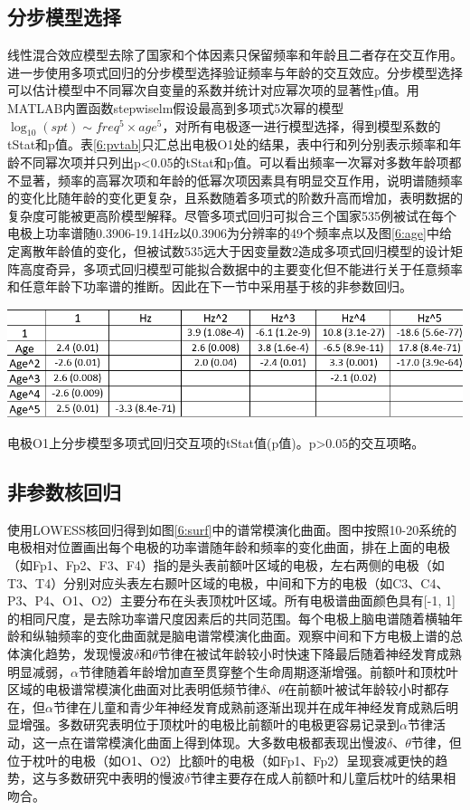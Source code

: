 \subsection{分步模型选择}
线性混合效应模型去除了国家和个体因素只保留频率和年龄且二者存在交互作用。进一步使用多项式回归的分步模型选择验证频率与年龄的交互效应。分步模型选择可以估计模型中不同幂次自变量的系数并统计对应幂次项的显著性p值。用MATLAB内置函数stepwiselm假设最高到多项式5次幂的模型$\log_{10}(spt)\sim{freq^5\times{age^5}}$，对所有电极逐一进行模型选择，得到模型系数的tStat和p值。表\ref{6:pvtab}只汇总出电极O1处的结果，表中行和列分别表示频率和年龄不同幂次项并只列出p<0.05的tStat和p值。可以看出频率一次幂对多数年龄项都不显著，频率的高幂次项和年龄的低幂次项因素具有明显交互作用，说明谱随频率的变化比随年龄的变化更复杂，且系数随着多项式的阶数升高而增加，表明数据的复杂度可能被更高阶模型解释。尽管多项式回归可拟合三个国家535例被试在每个电极上功率谱随0.3906-19.14Hz以0.3906为分辨率的49个频率点以及图\ref{6:age}中给定离散年龄值的变化，但被试数535远大于因变量数2造成多项式回归模型的设计矩阵高度奇异，多项式回归模型可能拟合数据中的主要变化但不能进行关于任意频率和任意年龄下功率谱的推断。因此在下一节中采用基于核的非参数回归。
\begin{table}[!h]
\includegraphics[width=\linewidth]{pic/Norm/pvtab.png}
\caption{电极O1上分步模型多项式回归交互项的tStat值(p值)。p>0.05的交互项略。}
\label{6:pvtab}
\end{table}

\subsection{非参数核回归}
使用LOWESS核回归得到如图\ref{6:surf}中的谱常模演化曲面。图中按照10-20系统的电极相对位置画出每个电极的功率谱随年龄和频率的变化曲面，排在上面的电极（如Fp1、Fp2、F3、F4）指的是头表前额叶区域的电极，左右两侧的电极（如T3、T4）分别对应头表左右颞叶区域的电极，中间和下方的电极（如C3、C4、P3、P4、O1、O2）主要分布在头表顶枕叶区域。所有电极谱曲面颜色具有[-1, 1]的相同尺度，是去除功率谱尺度因素后的共同范围。每个电极上脑电谱随着横轴年龄和纵轴频率的变化曲面就是脑电谱常模演化曲面。观察中间和下方电极上谱的总体演化趋势，发现慢波$\delta$和$\theta$节律在被试年龄较小时快速下降最后随着神经发育成熟明显减弱，$\alpha$节律随着年龄增加直至贯穿整个生命周期逐渐增强。前额叶和顶枕叶区域的电极谱常模演化曲面对比表明低频节律$\delta$、$\theta$在前额叶被试年龄较小时都存在，但$\alpha$节律在儿童和青少年神经发育成熟前逐渐出现并在成年神经发育成熟后明显增强。多数研究表明位于顶枕叶的电极比前额叶的电极更容易记录到$\alpha$节律活动，这一点在谱常模演化曲面上得到体现。大多数电极都表现出慢波$\delta$、$\theta$节律，但位于枕叶的电极（如O1、O2）比额叶的电极（如Fp1、Fp2）呈现衰减更快的趋势，这与多数研究中表明的慢波$\delta$节律主要存在成人前额叶和儿童后枕叶的结果相吻合。

